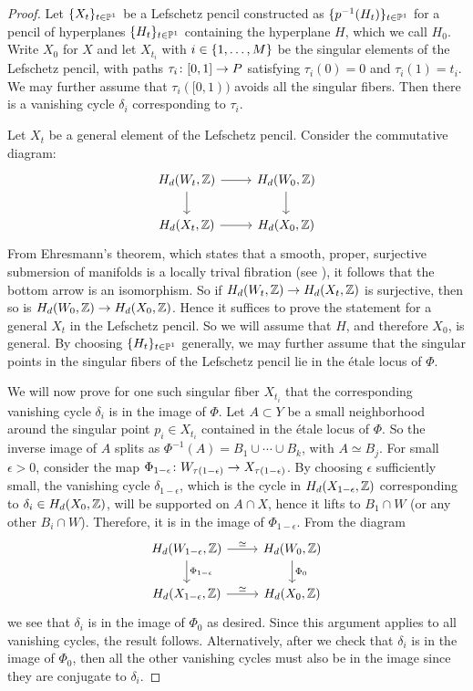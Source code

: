 \begin{proof}
  Let $\lbrace X_t\rbrace_{t \in \mathbb{P}^1}$ be a Lefschetz pencil constructed as $\lbrace p^{-1}(H_t)\rbrace_{t \in \mathbb{P}^1}$ for a pencil of hyperplanes $\lbrace H_t\rbrace_{t \in \mathbb{P}^1}$ containing the hyperplane $H$, which we call $H_0$. Write $X_0$ for $X$ and let $X_{t_i}$ with $i \in \lbrace1,\dots,M\rbrace$ be the singular elements of the Lefschetz pencil, with paths $\tau_i \colon [0,1] \to P$ satisfying $\tau_i(0) = 0$ and $\tau_i(1) = t_i$. We may further assume that $\tau_i([0,1))$ avoids all the singular fibers. Then there is a vanishing cycle $\delta_i$ corresponding to $\tau_i$.
  
  Let $X_t$ be a general element of the Lefschetz pencil. Consider the commutative diagram:
\[
  \begin{tikzcd}
    H_d(W_t,\Z) \arrow[r] \arrow[d] & H_d(W_0,\Z) \arrow[d]\\
    H_d(X_t,\Z) \arrow[r] & H_d(X_0,\Z)
  \end{tikzcd}
\]
From Ehresmann's theorem, which states that a smooth, proper, surjective submersion of manifolds is a locally trival fibration (see \eg \cite[Proposition 6.2.2]{HuybrechtsComplexGeometry}), it follows that the bottom arrow is an isomorphism. So if $H_d(W_t, \mathbb{Z}) \to H_d(X_t,\mathbb{Z})$ is surjective, then so is $H_d(W_0, \mathbb{Z}) \to H_d(X_0,\mathbb{Z})$. Hence it suffices to prove the statement for a general $X_t$ in the Lefschetz pencil. So we will assume that $H$, and therefore $X_0$, is general. By choosing $\lbrace H_t\rbrace_{t \in \mathbb{P}^1}$ generally, we may further assume that the singular points in the singular fibers of the Lefschetz pencil lie in the \'etale locus of $\Phi$.

We will now prove for one such singular fiber $X_{t_i}$ that the corresponding vanishing cycle $\delta_i$ is in the image of $\Phi$. Let $A \subset Y$ be a small neighborhood around the singular point $p_i \in X_{t_i}$ contained in the \'etale locus of $\Phi$. So the inverse image of $A$ splits as $\Phi^{-1}(A) = B_1 \cup \cdots \cup B_k$, with $A \simeq B_j$. For small $\epsilon > 0$, consider the map $\Phi_{1-\epsilon} \colon W_{\tau(1-\epsilon)} \to X_{\tau(1-\epsilon)}$. By choosing $\epsilon$ sufficiently small, the vanishing cycle $\delta_{1-\epsilon}$, which is the cycle in $H_d(X_{1-\epsilon},\mathbb{Z})$ corresponding to $\delta_i \in H_d(X_0,\mathbb{Z})$, will be supported on $A \cap X$, hence it lifts to $B_1 \cap W$ (or any other $B_i \cap W$). Therefore, it is in the image of $\Phi_{1-\epsilon}$. From the diagram
\[
  \begin{tikzcd}
    H_d(W_{1-\epsilon},\Z) \arrow[r,"\simeq"] \arrow[d,"\Phi_{1-\epsilon}"] & H_d(W_0,\Z) \arrow[d,"\Phi_0"] \\
H_d(X_{1-\epsilon},\Z) \arrow[r,"\simeq"] & H_d(X_0,\Z)
  \end{tikzcd}
\]
we see that $\delta_i$ is in the image of $\Phi_0$ as desired. Since this argument applies to all vanishing cycles, the result follows. Alternatively, after we check that $\delta_i$ is in the image of $\Phi_0$, then all the other vanishing cycles must also be in the image since they are conjugate to $\delta_i$.
\end{proof}

